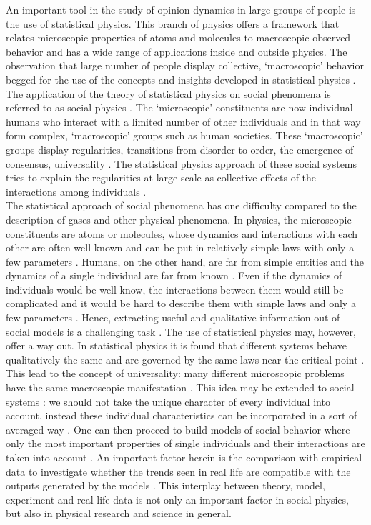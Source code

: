 \documentclass[11 pt , letterpaper , twoside , openright]{book}
\begin{document}
An important tool in the study of opinion dynamics in large groups of people is the use of statistical physics. This branch of physics offers a framework that relates microscopic properties of atoms and molecules to macroscopic observed behavior and has a wide range of applications inside and outside physics. The observation that large number of people display collective, `macroscopic' behavior begged for the use of the concepts and insights developed in statistical physics \cite{Sirbu2016}. The application of the theory of statistical physics on social phenomena is referred to as social physics \cite{Castellano2009}\cite{Galam2008}\cite{Galam1982}\cite{Stauffer2012}. The `microscopic' constituents are now individual humans who interact with a limited number of other individuals and in that way form complex, `macroscopic' groups such as human societies. These `macroscopic' groups display regularities, transitions from disorder to order, the emergence of consensus, universality \cite{Buchanan2007}. The statistical physics approach of these social systems tries to explain the regularities at large scale as collective effects of the interactions among individuals \cite{Sirbu2016}.\\
\newline
The statistical approach of social phenomena has one difficulty compared to the description of gases and other physical phenomena. In physics, the microscopic constituents are atoms or molecules, whose dynamics and interactions with each other are often well known and can be put in relatively simple laws with only a few parameters \cite{Castellano2009}. Humans, on the other hand, are far from simple entities and the dynamics of a single individual are far from known \cite{Castellano2009}. Even if the dynamics of individuals would be well know, the interactions between them would still be complicated and it would be hard to describe them with simple laws and only a few parameters \cite{Castellano2009}. Hence, extracting useful and qualitative information out of social models is a challenging task \cite{Castellano2009}. The use of statistical physics may, however, offer a way out. In statistical physics it is found that different systems behave qualitatively the same and are governed by the same laws near the critical point \cite{Hu2018}\cite{Kadanoff2010}. This lead to the concept of universality: many different microscopic problems have the same macroscopic manifestation \cite{Gug2015}\cite{Kadanoff2015}. This idea may be extended to social systems \cite{Hu2018}: we should not take the unique character of every individual into account, instead these individual characteristics can be incorporated in a sort of averaged way \cite{Gug2015}. One can then proceed to build models of social behavior where only the most important properties of single individuals and their interactions are taken into account \cite{Castellano2009}. An important factor herein is the comparison with empirical data to investigate whether the trends seen in real life are compatible with the outputs generated by the models \cite{Castellano2009}\cite{Pawel}. This interplay between theory, model, experiment and real-life data is not only an important factor in social physics, but also in physical research and science in general.
\end{document}
